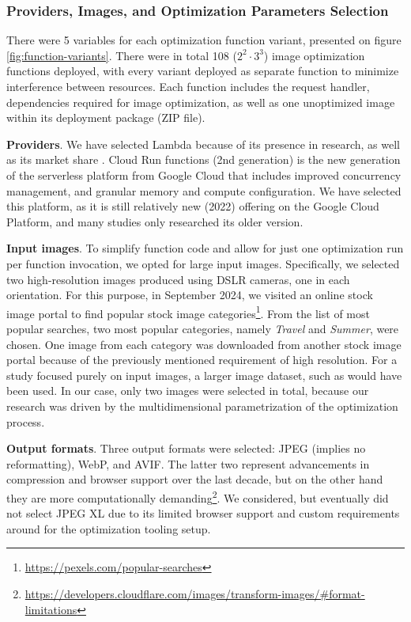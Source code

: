 \subsubsection{Providers, Images, and Optimization Parameters Selection}
\label{sec:providers-images-optimization-parameters}

There were 5 variables for each optimization function variant, presented on figure \ref{fig:function-variants}. There were in total 108 ($2^2 \cdot 3^3$) image optimization functions deployed, with every variant deployed as separate function to minimize interference between resources. Each function includes the request handler, dependencies required for image optimization, as well as one unoptimized image within its deployment package (ZIP file).

\textbf{Providers}. We have selected Lambda because of its presence in research, as well as its market share \cite{eismann2020review}. Cloud Run functions (2nd generation) is the new generation of the serverless platform from Google Cloud that includes improved concurrency management, and granular memory and compute configuration. We have selected this platform, as it is still relatively new (2022) offering on the Google Cloud Platform, and many studies only researched its older version.

\textbf{Input images}. To simplify function code and allow for just one optimization run per function invocation, we opted for large input images. Specifically, we selected two high-resolution images produced using DSLR cameras, one in each orientation. For this purpose, in September 2024, we visited an online stock image portal to find popular stock image categories\footnote{\url{https://pexels.com/popular-searches}}. From the list of most popular searches, two most popular categories, namely \emph{Travel} and \emph{Summer}, were chosen. One image from each category was downloaded from another stock image portal because of the previously mentioned requirement of high resolution. For a study focused purely on input images, a larger image dataset, such as \cite{CID22} would have been used. In our case, only two images were selected in total, because our research was driven by the multidimensional parametrization of the optimization process. 

\textbf{Output formats}. Three output formats were selected: JPEG (implies no reformatting), WebP, and AVIF. The latter two represent advancements in compression and browser support over the last decade, but on the other hand they are more computationally demanding\footnote{\url{https://developers.cloudflare.com/images/transform-images/\#format-limitations}}. We considered, but eventually did not select JPEG XL due to its limited browser support and custom requirements around for the optimization tooling setup.

